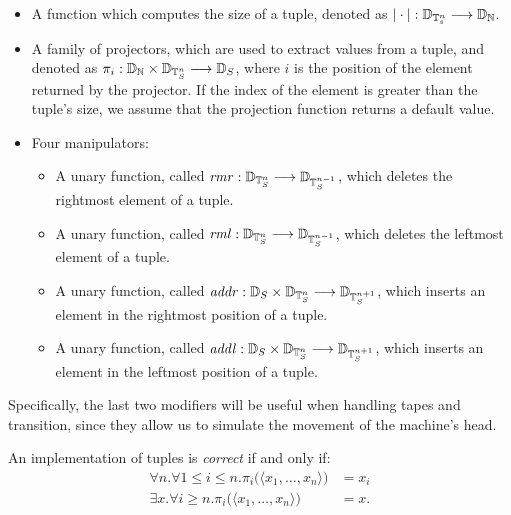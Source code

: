 \begin{conditional}{\appendixorsup}
\begin{itemize}
  \item A function which computes the size of a tuple,
  denoted as $|\cdot |:\mathbb{D}_{\mathbb{T}^n_s} \longrightarrow
  \mathbb{D}_{\mathbb{N}}$.

  \item A family of projectors, which are used to
  extract values from a tuple,
  and denoted as $\pi_i:\mathbb{D}_{\mathbb{N}} \times \mathbb{D}_{\mathbb{T}^n_S}
  \longrightarrow {\mathbb{D}}_S$,
  where $i$ is the position of the element returned by
  the projector.
  If the index of the element
  is greater than the tuple's size,
  we assume that the projection
  function returns a default value.

  \item Four manipulators:
  \begin{itemize}
  \item A unary function, called
  $\mathit{rmr} :\mathbb{D}_{\mathbb{T}^n_S} \longrightarrow
  \mathbb{D}_{\mathbb{T}^{n-1}_S}$, which deletes
  the rightmost element of a tuple.

  \item A unary function, called
  $\mathit{rml}: \mathbb{D}_{\mathbb{T}^n_S} \longrightarrow
  \mathbb{D}_{\mathbb{T}^{n-1}_S}$,
  which deletes the leftmost element
  of a tuple.

  \item A unary function, called $\mathit{addr}:
  \mathbb{D}_S\times \mathbb{D}_{\mathbb{T}^n_S}
  \longrightarrow \mathbb{D}_{\mathbb{T}^{n+1}_S}$,
  which inserts an element in the rightmost
  position of a tuple.


  \item  A unary function, called $\mathit{addl}:
  \mathbb{D}_S\times \mathbb{D}_{\mathbb{T}^n_S}
  \longrightarrow \mathbb{D}_{\mathbb{T}^{n+1}_S}$,
  which inserts an element in the leftmost
  position of a tuple.
  \end{itemize}
  \end{itemize}
  Specifically, the last two modifiers
  will be useful when
  handling tapes and transition,
  since they allow us to simulate
  the movement of
  the machine's head.





  \begin{defn}
  An implementation of tuples is \emph{correct}
  if and only if:
  \begin{align*}
  \forall n.\forall 1\leq i\leq n. \pi_i\big(\langle x_1,\dots,
  x_n\rangle\big) &= x_i \\
  \exists x.\forall i \ge n.\pi_i\big(\langle
  x_1,\dots, x_n\rangle \big) &= x.
  \end{align*}
  \end{defn}









\end{conditional}
